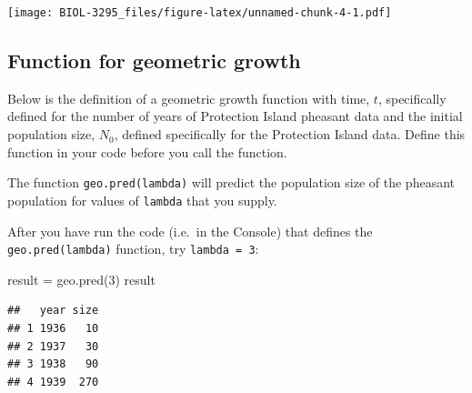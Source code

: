 \documentclass[
]{book}
\newenvironment{Shaded}{\begin{snugshade}}{\end{snugshade}}
\newcommand{\AttributeTok}[1]{\textcolor[rgb]{0.77,0.63,0.00}{#1}}
\newcommand{\ControlFlowTok}[1]{\textcolor[rgb]{0.13,0.29,0.53}{\textbf{#1}}}
\newcommand{\DecValTok}[1]{\textcolor[rgb]{0.00,0.00,0.81}{#1}}
\newcommand{\FunctionTok}[1]{\textcolor[rgb]{0.00,0.00,0.00}{#1}}
\newcommand{\NormalTok}[1]{#1}
\newcommand{\OtherTok}[1]{\textcolor[rgb]{0.56,0.35,0.01}{#1}}
\newcommand{\SpecialCharTok}[1]{\textcolor[rgb]{0.00,0.00,0.00}{#1}}
\begin{document}
\texttt{[image: BIOL-3295\_files/figure-latex/unnamed-chunk-4-1.pdf]}

\hypertarget{function-for-geometric-growth}{%
\subsection{Function for geometric growth}\label{function-for-geometric-growth}}

Below is the definition of a geometric growth function with time, \(t\), specifically defined for the number of years of Protection Island pheasant data and the initial population size, \(N_0\), defined specifically for the Protection Island data. Define this function in your code before you call the function.

\begin{Shaded}
\end{Shaded}

The function \texttt{geo.pred(lambda)} will predict the population size of the pheasant population for values of \texttt{lambda} that you supply.

After you have run the code (i.e.~in the Console) that defines the \texttt{geo.pred(lambda)} function, try \texttt{lambda\ =\ 3}:

\begin{Shaded}
\begin{Highlighting}[]
\NormalTok{result }\OtherTok{=} \FunctionTok{geo.pred}\NormalTok{(}\DecValTok{3}\NormalTok{)}
\NormalTok{result}
\end{Highlighting}
\end{Shaded}

\begin{verbatim}
##   year size
## 1 1936   10
## 2 1937   30
## 3 1938   90
## 4 1939  270
\end{verbatim}
\end{document}
